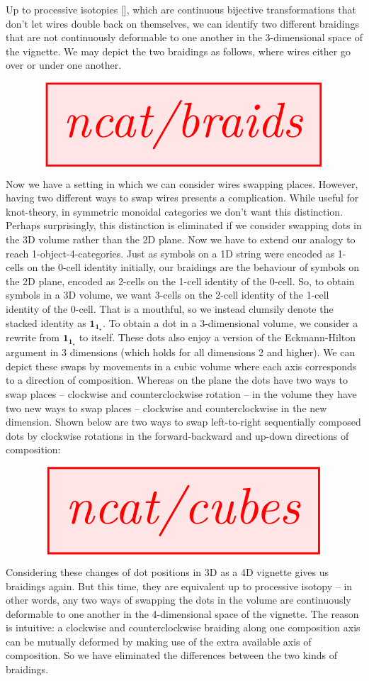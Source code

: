 \begin{fullwidth}
Up to processive isotopies [], which are continuous bijective transformations that don't let wires double back on themselves, we can identify two different braidings that are not continuously deformable to one another in the 3-dimensional space of the vignette. We may depict the two braidings as follows, where wires either go over or under one another.

\[\resizebox{\textwidth}{!}{\tikzfig{ncat/braids}}\]

Now we have a setting in which we can consider wires swapping places. However, having two different ways to swap wires presents a complication. While useful for knot-theory, in symmetric monoidal categories we don't want this distinction. Perhaps surprisingly, this distinction is eliminated if we consider swapping dots in the 3D volume rather than the 2D plane. Now we have to extend our analogy to reach 1-object-4-categories. Just as symbols on a 1D string were encoded as 1-cells on the 0-cell identity initially, our braidings are the behaviour of symbols on the 2D plane, encoded as 2-cells on the 1-cell identity of the 0-cell. So, to obtain symbols in a 3D volume, we want 3-cells on the 2-cell identity of the 1-cell identity of the 0-cell. That is a mouthful, so we instead clumsily denote the stacked identity as $\textbf{1}_{\textbf{1}_\star}$. To obtain a dot in a 3-dimensional volume, we consider a rewrite from $\textbf{1}_{\textbf{1}_\star}$ to itself. These dots also enjoy a version of the Eckmann-Hilton argument in 3 dimensions (which holds for all dimensions 2 and higher). We can depict these swaps by movements in a cubic volume where each axis corresponds to a direction of composition. Whereas on the plane the dots have two ways to swap places -- clockwise and counterclockwise rotation -- in the volume they have two new ways to swap places -- clockwise and counterclockwise in the new dimension. Shown below are two ways to swap left-to-right sequentially composed dots by clockwise rotations in the forward-backward and up-down directions of composition:

\[\resizebox{\textwidth}{!}{\tikzfig{ncat/cubes}}\]

Considering these changes of dot positions in 3D as a 4D vignette gives us braidings again. But this time, they are equivalent up to processive isotopy -- in other words, any two ways of swapping the dots in the volume are continuously deformable to one another in the 4-dimensional space of the vignette. The reason is intuitive: a clockwise and counterclockwise braiding along one composition axis can be mutually deformed by making use of the extra available axis of composition. So we have eliminated the differences between the two kinds of braidings.\\


\end{fullwidth}
